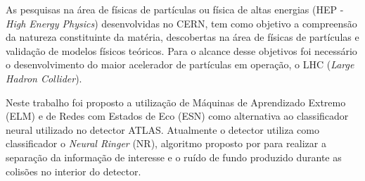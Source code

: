 

As pesquisas na área de físicas de partículas ou física de altas energias (HEP - \textit{High Energy Physics}) desenvolvidas no CERN, tem como objetivo a compreensão da natureza constituinte da matéria, descobertas na área de físicas de partículas e validação de modelos físicos teóricos. Para o alcance desse objetivos foi necessário o desenvolvimento do maior acelerador de partículas em operação, o LHC (\textit{Large Hadron Collider}).


Neste trabalho foi proposto a utilização de Máquinas de Aprendizado Extremo (ELM) e de Redes com Estados de Eco (ESN) como alternativa ao classificador neural utilizado no detector ATLAS. Atualmente o detector utiliza como classificador o \textit{Neural Ringer} (NR), algoritmo proposto por  para realizar a separação da informação de interesse e o ruído de fundo produzido durante as colisões no interior do detector.


